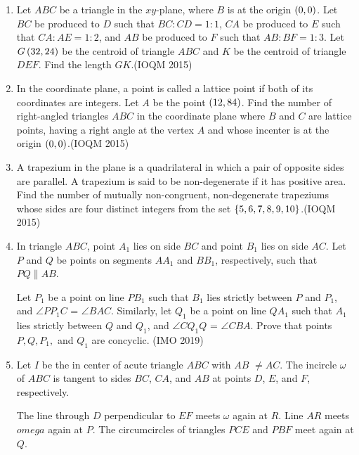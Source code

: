 \begin{enumerate}
    \item Let $ABC$ be a triangle in the $xy$-plane, where $B$ is at the origin $\left(0, 0\right)$. Let $BC$ be produced to $D$ such that $BC : CD = 1 : 1$, $CA$ be produced to $E$ such that $CA : AE = 1 : 2$, and $AB$ be produced to $F$ such that $AB : BF = 1 : 3$. Let $G\left(32, 24\right)$ be the centroid of triangle $ABC$ and $K$ be the centroid of triangle $DEF$. Find the length $GK$.\hfill(IOQM 2015)
    
    \item In the coordinate plane, a point is called a lattice point if both of its coordinates are integers. Let $A$ be the point $\left(12, 84\right)$. Find the number of right-angled triangles $ABC$ in the coordinate plane where $B$ and $C$ are lattice points, having a right angle at the vertex $A$ and whose incenter is at the origin $\left(0, 0\right)$.\hfill(IOQM 2015)
    
    \item A trapezium in the plane is a quadrilateral in which a pair of opposite sides are parallel. A trapezium is said to be non-degenerate if it has positive area. Find the number of mutually non-congruent, non-degenerate trapeziums whose sides are four distinct integers from the set $\left\{5, 6, 7, 8, 9, 10\right\}$.\hfill(IOQM 2015)
    
    \item In triangle  $ABC$, point $ A_1 $ lies on side $ BC $ and point $B_1$ lies on side $ AC $. Let  $P$ and $ Q $ be points on segments 
$AA_1$ and $BB_1 $, respectively, such that   $PQ \parallel AB$.

Let
 $P_1$ be a point on line  $PB_1$ such that $B_1$ lies strictly between 
$P$ and $P_1$, and $\angle PP_1C$ = $\angle BAC$. Similarly, let $Q_1$ 
be a point on line $QA_1$ such that $A_1$ lies strictly between $Q$ and 
$Q_1$, and $ \angle CQ_1Q$ = $\angle CBA $.
Prove that points $P, Q, P_1,$ and $Q_1$ are concyclic.
\hfill(IMO 2019)


\item
 Let $I$ be the in center of acute triangle $ABC$ with $AB$ $\neq AC$. 
The incircle $\omega$ of $ABC$ is tangent to sides $ BC$, $CA$, and $AB$
 at points $D$,  $E$, and $F$, respectively. 


The line 
through $D$ perpendicular to $EF$ meets $\omega$ again at $R$. Line $AR$
 meets $omega$ again at $P$. The circumcircles of triangles $PCE$ and 
$PBF$ meet again at $Q$.


\end{enumerate}
